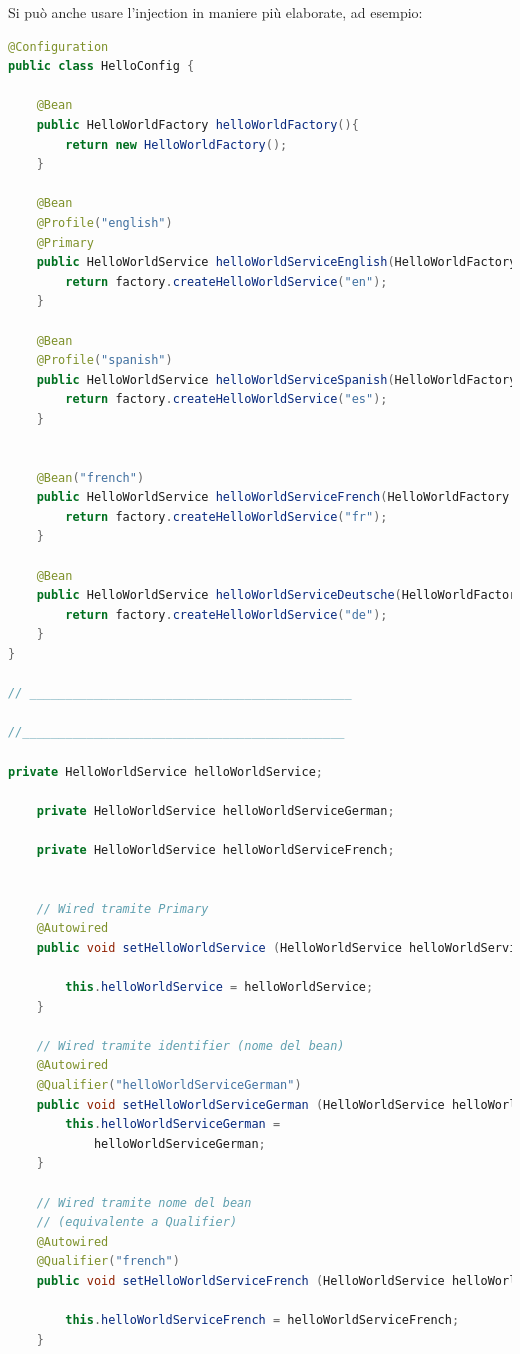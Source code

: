 \documentclass[11pt,a4paper]{book}
\begin{document}
Si può anche usare l'injection in maniere più elaborate, ad esempio:
\begin{lstlisting}[language = Java]
@Configuration
public class HelloConfig {

    @Bean
    public HelloWorldFactory helloWorldFactory(){
        return new HelloWorldFactory();
    }

    @Bean
    @Profile("english")
    @Primary
    public HelloWorldService helloWorldServiceEnglish(HelloWorldFactory factory){
        return factory.createHelloWorldService("en");
    }
    
    @Bean
    @Profile("spanish")
    public HelloWorldService helloWorldServiceSpanish(HelloWorldFactory factory){
        return factory.createHelloWorldService("es");
    }
    

    @Bean("french")
    public HelloWorldService helloWorldServiceFrench(HelloWorldFactory factory){
        return factory.createHelloWorldService("fr");
    }
    
    @Bean
    public HelloWorldService helloWorldServiceDeutsche(HelloWorldFactory factory){
        return factory.createHelloWorldService("de");
    }
}

// _____________________________________________

//_____________________________________________

private HelloWorldService helloWorldService;

    private HelloWorldService helloWorldServiceGerman;

    private HelloWorldService helloWorldServiceFrench;


	// Wired tramite Primary
    @Autowired
    public void setHelloWorldService (HelloWorldService helloWorldService) {
        
        this.helloWorldService = helloWorldService;
    }

	// Wired tramite identifier (nome del bean)
    @Autowired
    @Qualifier("helloWorldServiceGerman") 
    public void setHelloWorldServiceGerman (HelloWorldService helloWorldServiceGerman) {
        this.helloWorldServiceGerman = 
        	helloWorldServiceGerman;
    }

	// Wired tramite nome del bean
	// (equivalente a Qualifier)
    @Autowired
    @Qualifier("french")
    public void setHelloWorldServiceFrench (HelloWorldService helloWorldServiceFrench) {
        
        this.helloWorldServiceFrench = helloWorldServiceFrench;
    }
\end{lstlisting}
\end{document}
